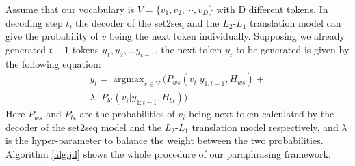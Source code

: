 Assume that our vocabulary is $V = \{v_1, v_2, \cdots, v_D\}$ with D different tokens. In decoding step $t$, the decoder of the set2seq and the $L_2$-$L_1$ translation model can give the probability of $v$ being the next token individually. Supposing we already generated $t-1$ tokens $y_1, y_2, ... y_{t-1}$, the next token $y_t$ to be generated is given by the following equation:
\begin{multline}
y_t = \mathop{\arg\max}_{v \in V} \big( P_{ws}\left( v_i|y_{1:t-1},H_{ws} \right) + \\
\lambda \cdot P_{bt}\left( v_i|y_{1:t-1},H_{bt}\right) \big)
\label{eq:pro}
\end{multline}
Here $P_{ws}$ and $P_{bt}$ are the probabilities of $v_i$ being next token calculated by the decoder of the set2seq model and the $L_2$-$L_1$ translation model respectively, and $\lambda$ is the hyper-parameter to balance the weight between the two probabilities. 
Algorithm \ref{alg:jd} shows the whole procedure of our paraphrasing framework.



